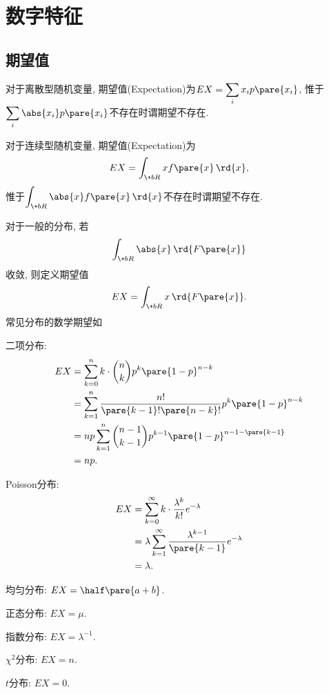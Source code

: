 \documentclass{ctexart}
\begin{document}
\section{数字特征} %
\label{sec:数字特征}

\subsection{期望值} %
\label{sub:期望值}

\begin{definition}
    对于离散型随机变量, 期望值(Expectation)为$EX = \displaystyle \sum_i x_ip\pare{x_i}$, 惟于$\displaystyle \sum_{i} \abs{x_i} p\pare{x_i}$不存在时谓期望不存在.
\end{definition}
\begin{definition}
    对于连续型随机变量, 期望值(Expectation)为
    \[ EX = \displaystyle \int_{\+bR} xf\pare{x}\,\rd{x}, \]
    惟于$\displaystyle \int_{\+bR} \abs{x}f\pare{x}\,\rd{x}$不存在时谓期望不存在.
\end{definition}
对于一般的分布, 若
\[ \int_{\+bR} \abs{x}\,\rd{F\pare{x}} \]
收敛, 则定义期望值
\[ EX = \int_{\+bR} x\,\rd{F\pare{x}}. \]
常见分布的数学期望如
\begin{cenum}
    \item 二项分布:
    \begin{align*}
        EX &= \sum_{k=0}^n k\cdot\binom{n}{k} p^k\pare{1-p}^{n-k} \\
        &= \sum_{k=1}^n \frac{n!}{\pare{k-1}!\pare{n-k}!} p^k\pare{1-p}^{n-k} \\
        &= np \sum_{k=1}^n \binom{n-1}{k-1} p^{k-1}\pare{1-p}^{n-1-\pare{k-1}} \\
        &= np.
    \end{align*}
    \item Poisson分布:
    \begin{align*}
        EX &= \sum_{k=0}^\infty k\cdot \frac{\lambda^k}{k!}e^{-\lambda} \\
        &= \lambda \sum_{k=1}^\infty \frac{\lambda^{k-1}}{\pare{k-1}}e^{-\lambda} \\
        &= \lambda.
    \end{align*}
    \item 均匀分布: $\displaystyle EX = \half\pare{a+b}$.
    \item 正态分布: $\displaystyle EX = \mu$.
    \item 指数分布: $\displaystyle EX = \lambda^{-1}$.
    \item $\chi^2$分布: $\displaystyle EX = n$.
    \item $t$分布: $\displaystyle EX = 0$.
\end{cenum}
\end{document}
